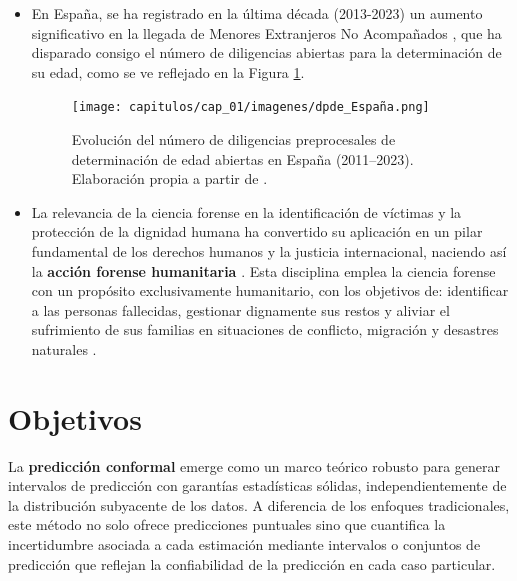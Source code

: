 \begin{itemize}
    \item En España, se ha registrado en la última década (2013-2023) un aumento significativo en la llegada de Menores Extranjeros No Acompañados \cite{fge2024,fge2019,fge2016,fge2013}, que ha disparado consigo el número de diligencias abiertas para la determinación de su edad, como se ve reflejado en la Figura \ref{fig:evolucion_DPDE}.

    \begin{figure}[h]
        \centering
        \texttt{[image: capitulos/cap\_01/imagenes/dpde\_España.png]}
        \caption{
            Evolución del número de diligencias preprocesales de determinación de edad abiertas en España (2011–2023). Elaboración propia a partir de \cite{fge2013,fge2016,fge2019, fge2024}.
        } 
        \label{fig:evolucion_DPDE}
    \end{figure}

    \item La relevancia de la ciencia forense en la identificación de víctimas y la protección de la dignidad humana ha convertido su aplicación en un pilar fundamental de los derechos humanos y la justicia internacional, naciendo así la  \textbf{acción forense humanitaria} \cite{cordner2017}. Esta disciplina emplea la ciencia forense con un propósito exclusivamente humanitario, con los objetivos de: identificar a las personas fallecidas, gestionar dignamente sus restos y aliviar el sufrimiento de sus familias en situaciones de conflicto, migración y desastres naturales \cite{tidballbinz2021}. 

\end{itemize}


\section{Objetivos}

La \textbf{predicción conformal} emerge como un marco teórico robusto para generar intervalos de predicción con garantías estadísticas sólidas, independientemente de la distribución subyacente de los datos. A diferencia de los enfoques tradicionales, este método no solo ofrece predicciones puntuales sino que cuantifica la incertidumbre asociada a cada estimación mediante intervalos o conjuntos de predicción que reflejan la confiabilidad de la predicción en cada caso particular.

